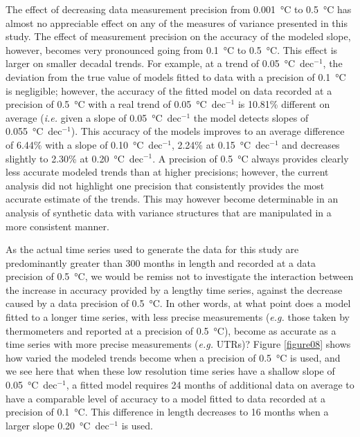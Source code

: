 \documentclass[]{ametsoc}
\begin{document}
The effect of decreasing data measurement precision from \SI{0.001}{\degreeCelsius} to \SI{0.5}{\degreeCelsius} has almost no appreciable effect on any of the measures of variance presented in this study. The effect of measurement precision on the accuracy of the modeled slope, however, becomes very pronounced going from \SI{0.1}{\degreeCelsius} to \SI{0.5}{\degreeCelsius}. This effect is larger on smaller decadal trends. For example, at a trend of \SI{0.05}{\degreeCelsius}~dec$^{-1}$, the deviation from the true value of models fitted to data with a precision of \SI{0.1}{\degreeCelsius} is negligible; however, the accuracy of the fitted model on data recorded at a precision of \SI{0.5}{\degreeCelsius} with a real trend of \SI{0.05}{\degreeCelsius}~dec$^{-1}$ is 10.81\% different on average (\emph{i.e.} given a slope of \SI{0.05}{\degreeCelsius}~dec$^{-1}$ the model detects slopes of \SI{0.055}{\degreeCelsius}~dec$^{-1}$). This accuracy of the models improves to an average difference of 6.44\% with a slope of \SI{0.10}{\degreeCelsius}~dec$^{-1}$, 2.24\% at \SI{0.15}{\degreeCelsius}~dec$^{-1}$ and decreases slightly to 2.30\% at \SI{0.20}{\degreeCelsius}~dec$^{-1}$. A precision of \SI{0.5}{\degreeCelsius} always provides clearly less accurate modeled trends than at higher precisions; however, the current analysis did not highlight one precision that consistently provides the most accurate estimate of the trends. This may however become determinable in an analysis of synthetic data with variance structures that are manipulated in a more consistent manner.

As the actual time series used to generate the data for this study are predominantly greater than 300 months in length and recorded at a data precision of \SI{0.5}{\degreeCelsius}, we would be remiss not to investigate the interaction between the increase in accuracy provided by a lengthy time series, against the decrease caused by a data precision of \SI{0.5}{\degreeCelsius}. In other words, at what point does a model fitted to a longer time series, with less precise measurements (\emph{e.g.} those taken by thermometers and reported at a precision of \SI{0.5}{\degreeCelsius}), become as accurate as a time series with more precise measurements (\emph{e.g.} UTRs)? Figure \ref{figure08} shows how varied the modeled trends become when a precision of \SI{0.5}{\degreeCelsius} is used, and we see here that when these low resolution time series have a shallow slope of \SI{0.05}{\degreeCelsius}~dec$^{-1}$, a fitted model requires 24 months of additional data on average to have a comparable level of accuracy to a model fitted to data recorded at a precision of \SI{0.1}{\degreeCelsius}. This difference in length decreases to 16 months when a larger slope \SI{0.20}{\degreeCelsius}~dec$^{-1}$ is used.
\end{document}
